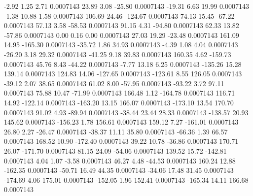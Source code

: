        -2.92        1.25        2.71     0.0007143
       23.89        3.08      -25.80     0.0007143
      -19.31        6.63       19.99     0.0007143
       -1.38       10.88        1.58     0.0007143
      106.69       24.46     -124.67     0.0007143
       74.13       15.45      -67.22     0.0007143
       57.13        3.58      -58.53     0.0007143
       91.15        4.31      -94.80     0.0007143
       62.33       13.82      -57.86     0.0007143
        0.00        0.16        0.00     0.0007143
       27.03       19.29      -23.48     0.0007143
      161.09       14.95     -165.30     0.0007143
      -35.72        1.86       34.93     0.0007143
       -4.39        1.08        4.04     0.0007143
      -26.20        3.18       29.32     0.0007143
      -41.25        9.18       39.83     0.0007143
      160.35        4.62     -159.73     0.0007143
       45.76        8.43      -44.22     0.0007143
       -7.77       13.18        6.25     0.0007143
     -135.26       15.28      139.14     0.0007143
      124.83       14.06     -127.65     0.0007143
     -123.61        8.55      126.05     0.0007143
      -39.12        2.07       38.65     0.0007143
       61.02        8.00      -57.95     0.0007143
      -93.22        3.72       97.11     0.0007143
       75.88       10.47      -71.99     0.0007143
      166.48        1.12     -164.78     0.0007143
      116.71       14.92     -122.14     0.0007143
     -163.20       13.15      166.07     0.0007143
     -173.10       13.54      170.70     0.0007143
       91.02        4.93      -89.94     0.0007143
      -38.44       23.44       28.33     0.0007143
     -138.57       20.93      145.62     0.0007143
     -156.23        1.78      156.61     0.0007143
      159.12        7.27     -161.01     0.0007143
       26.80        2.27      -26.47     0.0007143
      -38.37       11.11       35.80     0.0007143
      -66.36        1.39       66.57     0.0007143
      168.52       10.90     -172.40     0.0007143
       39.22       10.78      -36.86     0.0007143
      170.71       26.07     -171.70     0.0007143
       81.15       24.09      -54.06     0.0007143
      139.52       15.72     -142.81     0.0007143
        4.04        1.07       -3.58     0.0007143
       46.27        4.48      -44.53     0.0007143
      160.24       12.88     -162.35     0.0007143
      -50.71       16.49       44.35     0.0007143
      -34.06       17.48       31.45     0.0007143
     -174.69        4.06      175.01     0.0007143
     -152.05        1.96      152.41     0.0007143
     -165.34       14.11      166.68     0.0007143
